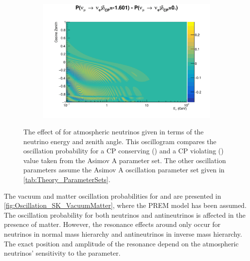 \begin{figure}[h]
  \begin{subfigure}[t]{\textwidth}
    \includegraphics[width=\textwidth, trim={0mm 0mm 0mm 0mm}, clip,page=1]{Figures/Oscillation/AtmDCPSens.pdf}
  \end{subfigure}
  \caption{The effect of \dcp for atmospheric neutrinos given in terms of the neutrino energy and zenith angle. This oscillogram compares the  oscillation probability for a CP conserving () and a CP violating () value taken from the Asimov A parameter set. The other oscillation parameters assume the Asimov A oscillation parameter set given in \autoref{tab:Theory_ParameterSets}.}
  \label{fig:Oscillation_SK_DCPSensitivity}
\end{figure}

 The vacuum and matter oscillation probabilities for  and  are presented in \autoref{fig:Oscillation_SK_VacuumMatter}, where the PREM model has been assumed. The oscillation probability for both neutrinos and antineutrinos is affected in the presence of matter. However, the resonance effects around  only occur for neutrinos in normal mass hierarchy and antineutrinos in inverse mass hierarchy. The exact position and amplitude of the resonance depend on \sinsqatm {}  the atmospheric neutrinos'  sensitivity to the parameter.

